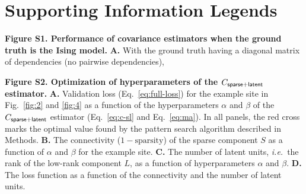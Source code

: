 % 
%
%

\newpage
\section*{Supporting Information Legends}
%
% 
\begin{description}
\item {\bf Figure S1. Performance of covariance estimators when the ground truth is the  Ising model.} 
{\bf A.} With the ground truth having a diagonal matrix of dependencies (no pairwise dependencies), 

\item {\bf Figure S2. Optimization of hyperparameters of the $C_{\sf sparse+latent}$ estimator.} {\bf A.} Validation loss (Eq.~\ref{eq:full-loss}) for the example site in Fig.~\ref{fig:2} and \ref{fig:4} as a function of the hyperparameters $\alpha$ and $\beta$ of the $C_{\sf sparse+latent}$ estimator (Eq.~\ref{eq:c-sl} and Eq.~\ref{eq:ma}). In all panels, the red cross marks the optimal value found by the pattern search algorithm described in Methods.
{\bf B.} The connectivity ($1-\mbox{sparsity}$) of the sparse component $S$ as a function of $\alpha$ and $\beta$ for the example site.
{\bf C.} The number of latent units, \emph{i.e.}~the rank of the low-rank component $L$, as a function of hyperparameters $\alpha$ and $\beta$.
{\bf D.} The loss function as a function of the connectivity and the number of latent units.
\end{description}



